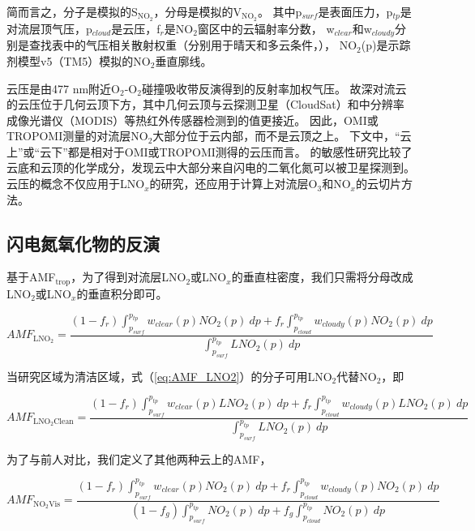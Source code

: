 简而言之，分子是模拟的S$_{\textrm{NO$_2$}}$，分母是模拟的V$_{\textrm{NO$_2$}}$。
其中p$_{surf}$是表面压力，p$_{tp}$是对流层顶气压，p$_{cloud}$是云压，f$_{r}$是NO$_2$窗区中的云辐射率分数，
w$_{clear}$和w$_{cloudy}$分别是查找表中的气压相关散射权重（分别用于晴天和多云条件，\citet{Lorente.2017}），
NO$_2$(p)是示踪剂模型v5（TM5）模拟的NO$_2$垂直廓线。

云压是由477 nm附近O$_2$-O$_2$碰撞吸收带反演得到的反射率加权气压\citep{Acarreta.2004,Sneep.2008,Stammes.2008}。
故深对流云的云压位于几何云顶下方，其中几何云顶与云探测卫星（CloudSat）和中分辨率成像光谱仪（MODIS）等热红外传感器检测到的值更接近\citep{Vasilkov.2008,Joiner.2012}。
因此，OMI或TROPOMI测量的对流层NO$_2$大部分位于云内部，而不是云顶之上。
下文中，“云上”或“云下”都是相对于OMI或TROPOMI测得的云压而言。
\citet{Beirle.2009}的敏感性研究比较了云底和云顶的化学成分，发现云中大部分来自闪电的二氧化氮可以被卫星探测到。
云压的概念不仅应用于LNO$_x$的研究，还应用于计算上对流层O$_3$和NO$_x$的云切片方法\citep{Ziemke.2009,Choi.2014,Strode.2017,Ziemke.2017,Marais.2018}。

\subsection{闪电氮氧化物的反演} \label{section:amf_definition}

基于AMF$_{\textrm{trop}}$，为了得到对流层LNO$_2$或LNO$_x$的垂直柱密度，我们只需将分母改成LNO$_2$或LNO$_x$的垂直积分即可。

\begin{equation} \label{eq:AMF_LNO2}
AMF_{\textrm{LNO$_2$}} = \frac{(1-f_r) \int_{p_{surf}}^{p_{tp}} w_{clear}(p) NO_2(p) \: dp + f_r \int_{p_{cloud}}^{p_{tp}} w_{cloudy}(p) NO_2(p) \: dp}{\int_{p_{surf}}^{p_{tp}} LNO_2(p) \: dp}
\end{equation}

当研究区域为清洁区域，式（\ref{eq:AMF_LNO2}）的分子可用LNO$_2$代替NO$_2$，即

\begin{equation} \label{eq:AMF_LNO2clean}
AMF_{\textrm{LNO$_2$Clean}} = \frac{(1-f_r) \int_{p_{surf}}^{p_{tp}} w_{clear}(p) LNO_2(p) \: dp + f_r \int_{p_{cloud}}^{p_{tp}} w_{cloudy}(p) LNO_2(p) \: dp}{\int_{p_{surf}}^{p_{tp}} LNO_2(p) \: dp}
\end{equation}

为了与前人对比，我们定义了其他两种云上的AMF，

\begin{equation} \label{eq:AMF_NO2Vis}
AMF_{\textrm{NO$_2$Vis}} = \frac{(1-f_r) \int_{p_{surf}}^{p_{tp}} w_{clear}(p) NO_2(p) \: dp + f_r \int_{p_{cloud}}^{p_{tp}} w_{cloudy}(p) NO_2(p) \: dp}{(1-f_g) \int_{p_{surf}}^{p_{tp}} NO_2(p) \: dp + f_g \int_{p_{cloud}}^{p_{tp}} NO_2(p) \: dp}
\end{equation}


